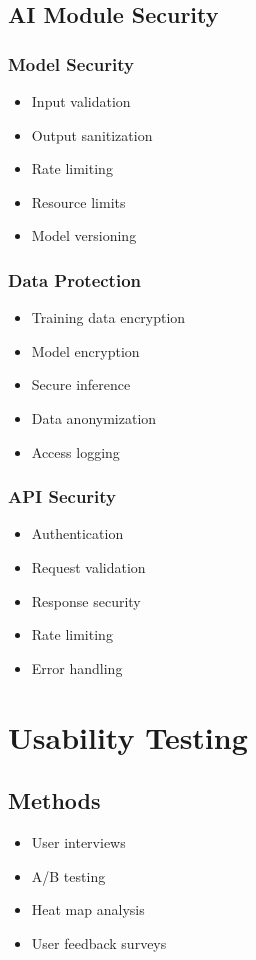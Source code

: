 \subsection{AI Module Security}

\subsubsection{Model Security}
\begin{itemize}
    \item Input validation
    \item Output sanitization
    \item Rate limiting
    \item Resource limits
    \item Model versioning
\end{itemize}

\subsubsection{Data Protection}
\begin{itemize}
    \item Training data encryption
    \item Model encryption
    \item Secure inference
    \item Data anonymization
    \item Access logging
\end{itemize}

\subsubsection{API Security}
\begin{itemize}
    \item Authentication
    \item Request validation
    \item Response security
    \item Rate limiting
    \item Error handling
\end{itemize}

\section{Usability Testing}

\subsection{Methods}
\begin{itemize}
    \item User interviews
    \item A/B testing
    \item Heat map analysis
    \item User feedback surveys
\end{itemize}

